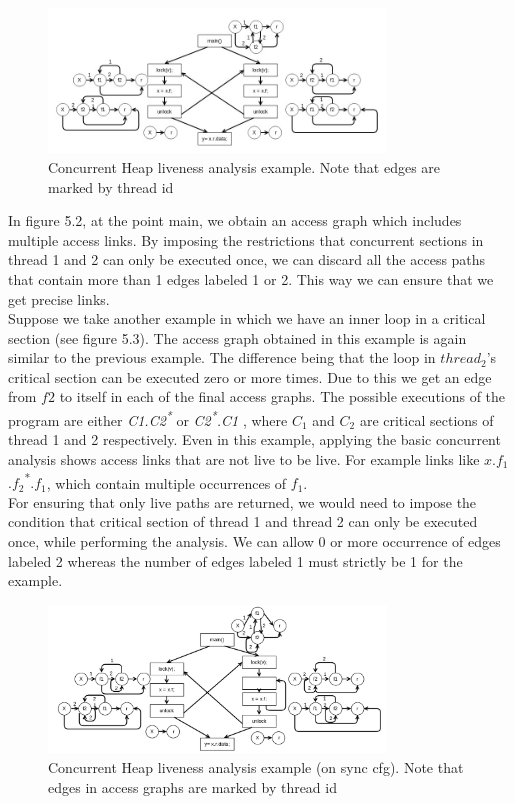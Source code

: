 \begin{figure}
	\centering
	\includegraphics[width=0.8\textwidth]{Figures/conc_analysis_thr_itr3.jpg}
	\caption{Concurrent Heap liveness analysis example. Note that edges are marked by thread id}
	\label{fig:threadidanalysis}
\end{figure}

In figure 5.2, at the point main, we obtain an access graph which includes multiple access links. By imposing the restrictions that concurrent sections in thread 1 and 2 can only be executed once, we can discard all the access paths that contain more than 1 edges labeled 1 or 2. This way we can ensure that we get precise links. \\

Suppose we take another example in which we have an inner loop in a critical section (see figure 5.3). The access  graph obtained in this example is again similar to the previous example. The difference being that the loop in $thread_2$'s critical section can be executed zero or more times. Due to this we get an edge from $f2$ to itself in each of the final access graphs. The possible executions of the program are either \emph{C1.C2\textsuperscript{*} } or \emph{ C2\textsuperscript{*}.C1 } , where $C_1$ and $C_2$ are critical sections of thread 1 and 2 respectively. Even in this example, applying the basic concurrent analysis shows access links that are not live to be live. For example links like {$x$.$f_1$.$f_2$\textsuperscript{*}.$f_1$}, which contain multiple occurrences of $f_1$. \\

For ensuring that only live paths are returned, we would need to impose the condition that critical section of thread 1 and thread 2 can only be executed once, while performing the analysis. We can allow 0 or more occurrence of edges labeled 2 whereas the number of edges labeled 1 must strictly be 1 for the example. \\ 

\begin{figure}
	\centering
	\includegraphics[width=0.8\textwidth]{Figures/rsz_loop_inside.png}
	\caption{Concurrent Heap liveness analysis example (on sync cfg). Note that edges in access graphs are marked by thread id}
	\label{fig:threadidanalysis}
\end{figure}

